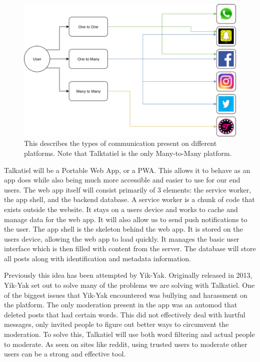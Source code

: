 \documentclass[12pt]{article}
\begin{document}
\begin{figure}
  \includegraphics[scale=0.75]{similarServices}
  \caption{This describes the types of communication present on different platforms. Note that Talktatiel is the only Many-to-Many platform.}
\end{figure}

	Talkatiel will be a Portable Web App, or a PWA.  This allows it to behave as an app does while also being much more accessible and easier to use for our end users.  The web app itself will consist primarily of 3 elements:   the service worker, the app shell, and the backend database.  A service worker is a chunk of code that exists outside the website.  It stays on a users device and works to cache and manage data for the web app.  It will also allow us to send push notifications to the user.  The app shell is the skeleton behind the web app.  It is stored on the users device, allowing the web app to load quickly.  It manages the basic user interface which is then filled with content from the server.  The database will store all posts along with identification and metadata information.

	Previously this idea has been attempted by Yik-Yak.  Originally released in 2013, Yik-Yak set out to solve many of the problems we are solving with Talkatiel.  One of the biggest issues that Yik-Yak encountered was bullying and harassment on the platform\cite{item1}.  The only moderation present in the app was an automod that deleted posts that had certain words.  This did not effectively deal with hurtful messages, only invited people to figure out better ways to circumvent the moderation.  To solve this, Talkatiel will use both word filtering and actual people to moderate.  As seen on sites like reddit, using trusted users to moderate other users can be a strong and effective tool.
\end{document}
